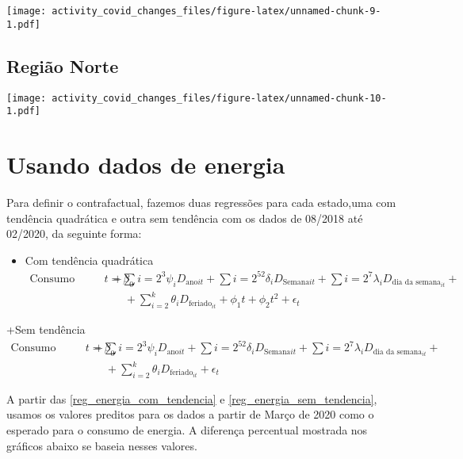 \documentclass[
]{article}
\providecommand{\tightlist}{%
  \setlength{\itemsep}{0pt}\setlength{\parskip}{0pt}}
\begin{document}
\texttt{[image: activity\_covid\_changes\_files/figure-latex/unnamed-chunk-9-1.pdf]}

\pagebreak

\hypertarget{regiuxe3o-norte}{%
\subsection{Região Norte}\label{regiuxe3o-norte}}

\texttt{[image: activity\_covid\_changes\_files/figure-latex/unnamed-chunk-10-1.pdf]}

\pagebreak

\hypertarget{usando-dados-de-energia}{%
\section{Usando dados de energia}\label{usando-dados-de-energia}}

Para definir o contrafactual, fazemos duas regressões para cada
estado,uma com tendência quadrática e outra sem tendência com os dados
de 08/2018 até 02/2020, da seguinte forma:

\begin{itemize}
\tightlist
\item
  Com tendência quadrática \begin{equation}
  \begin{split} \label{reg_energia_com_tendencia}
  \text{Consumo Diario}{t} = \beta_0 & + \sum{i=2}^{3} \psi_i D_{\text{ano}{it}}+ \sum{i=2}^{52} \delta_i D_{\text{Semana}{it}} + \sum{i=2}^{7} \lambda_i D_{\text{dia da semana}_{it}} + \\
  &\quad + \sum_{i=2}^{k} \theta_i D_{\text{feriado}_{it}} + \phi_1t + \phi_2t^2 + \epsilon_t
  \end{split}
  \end{equation}
\end{itemize}

+Sem tendência \begin{equation}
\begin{split} \label{reg_energia_sem_tendencia}
\text{Consumo Diario}{t} = \beta_0 & + \sum{i=2}^{3} \psi_i D_{\text{ano}{it}}+ \sum{i=2}^{52} \delta_i D_{\text{Semana}{it}} + \sum{i=2}^{7} \lambda_i D_{\text{dia da semana}_{it}} + \\
&\quad + \sum_{i=2}^{k} \theta_i D_{\text{feriado}_{it}} + \epsilon_t
\end{split}
\end{equation}

A partir das \ref{reg_energia_com_tendencia} e
\ref{reg_energia_sem_tendencia}, usamos os valores preditos para os
dados a partir de Março de 2020 como o esperado para o consumo de
energia. A diferença percentual mostrada nos gráficos abaixo se baseia
nesses valores.
\end{document}
